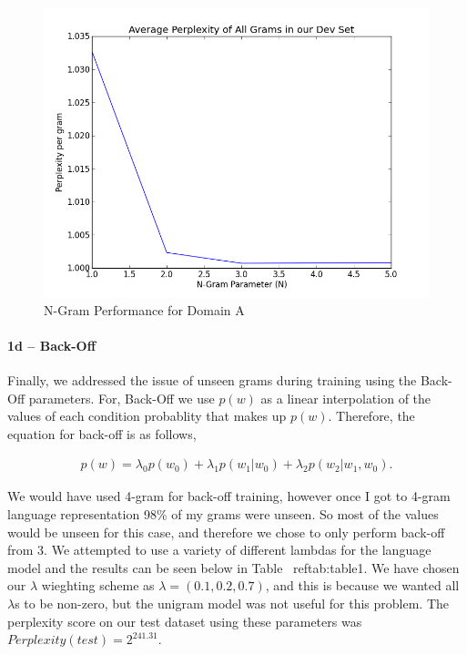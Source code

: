 \documentclass[paper=a4, fontsize=11pt]{scrartcl} %
\begin{document}
\begin{figure}
\centering
\includegraphics[scale=0.4]{figure_2.png}
\caption{N-Gram Performance for Domain A}
\label{fig:figure2}
\end{figure}

\paragraph{1d -- Back-Off}
Finally, we addressed the issue of unseen grams during training using the Back-Off parameters.  For, Back-Off we use $p(w)$ as a linear interpolation of the values of each condition probablity that makes up $p(w)$.  Therefore, the equation for back-off is as follows,

\begin{align}
p(w)=\lambda_0p(w_0) + \lambda_1p(w_1|w_0) + \lambda_2p(w_2|w_1,w_0).
\end{align}

We would have used 4-gram for back-off training, however once I got to 4-gram language representation 98\% of my grams were unseen.  
So most of the values would be unseen for this case, and therefore we chose to only perform back-off from 3.
We attempted to use a variety of different lambdas for the language model and the results can be seen below in Table ~ref{tab:table1}.  We have chosen our $\lambda$ wieghting scheme as $\lambda=(0.1,0.2,0.7)$, and this is because we wanted all $\lambda$s to be non-zero, but the unigram model was not useful for this problem. The perplexity score on our test dataset using these parameters was $Perplexity(test) = 2^{241.31}$.  
\end{document}
